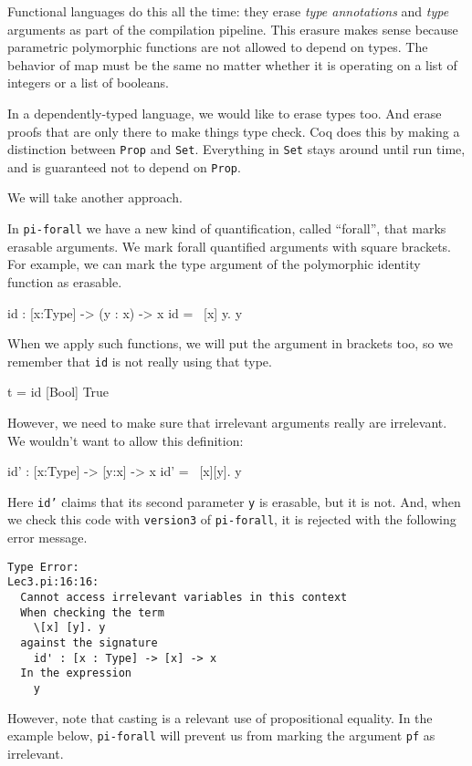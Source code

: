 \documentclass{article}
\newcommand\cd[1]{\lstinline[language=Haskell]{#1}}
\newcommand\pif{\texttt{pi-forall}\xspace}
\theoremstyle{definition}
\begin{document}
Functional languages do this all the time: they erase \emph{type annotations}
and \emph{type} arguments as part of the compilation pipeline. This erasure
makes sense because parametric polymorphic functions are not allowed to
depend on types. The behavior of map must be the same no matter whether it is
operating on a list of integers or a list of booleans.

In a dependently-typed language, we would like to erase types too. And erase proofs
that are only there to make things type check. Coq does this by making a
distinction between \texttt{Prop} and \texttt{Set}. Everything in \texttt{Set}
stays around until run time, and is guaranteed not to depend on \texttt{Prop}.

We will take another approach.

In \pif we have a new kind of quantification, called ``forall'', that marks
erasable arguments. We mark forall quantified arguments with square
brackets. For example, we can mark the type argument of the polymorphic
identity function as erasable.

\begin{piforall}
id : [x:Type] -> (y : x) -> x
id = \ [x] y. y
\end{piforall}

When we apply such functions, we will put the argument in brackets too, so
we remember that \texttt{id} is not really using that type.

\begin{piforall}
t = id [Bool] True
\end{piforall}

However, we need to make sure that irrelevant arguments really are
irrelevant. We wouldn't want to allow this definition:

\begin{piforall}
id' : [x:Type] -> [y:x] -> x
id' = \ [x][y]. y
\end{piforall}
\indent
Here \texttt{id'} claims that its second parameter \cd{y} is
erasable, but it is not. And, when we check this code with
\texttt{version3} of \pif, it is rejected with the following error
message.

\begin{verbatim}
Type Error:
Lec3.pi:16:16:
  Cannot access irrelevant variables in this context
  When checking the term
    \[x] [y]. y
  against the signature
    id' : [x : Type] -> [x] -> x
  In the expression
    y
\end{verbatim}

However, note that casting is a relevant use of propositional equality. In the
example below, \pif will prevent us from marking the argument \texttt{pf} as
irrelevant.
\end{document}
